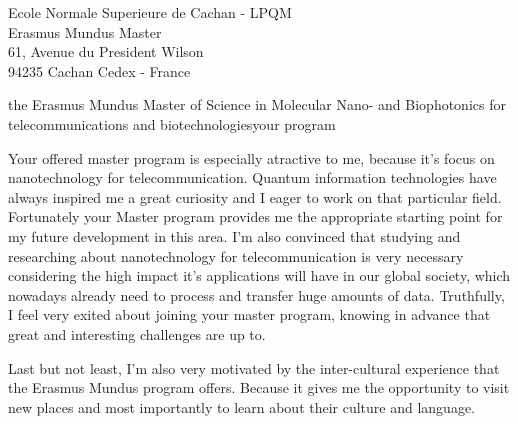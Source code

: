\documentclass[12pt]{letter}
\begin{document}
\begin{letter}{Ecole Normale Superieure de Cachan - LPQM\\
Erasmus Mundus Master\\
61, Avenue du President Wilson\\
94235 Cachan Cedex - France}

\begin{content}{the Erasmus Mundus Master of Science in Molecular Nano- and Biophotonics for telecommunications and biotechnologies}{your program}

Your offered master program is especially atractive to me, because it's focus on
nanotechnology for telecommunication. Quantum information technologies have
always inspired me a great curiosity and I eager to work on that particular
field. Fortunately your Master program provides me the appropriate starting
point for my future development in this area. I'm also convinced that studying
and researching about nanotechnology for telecommunication is very necessary
considering the high impact it's applications will have in our global society,
which nowadays already need to process and transfer huge amounts of data.
Truthfully, I feel very exited about joining your master program, knowing in
advance that great and interesting challenges are up to.

Last but not least, I'm also very motivated by the inter-cultural experience
that the Erasmus Mundus program offers. Because it gives me the opportunity
to visit new places and most importantly to learn about their culture and
language.

\end{content}

\end{letter}
\end{document}
